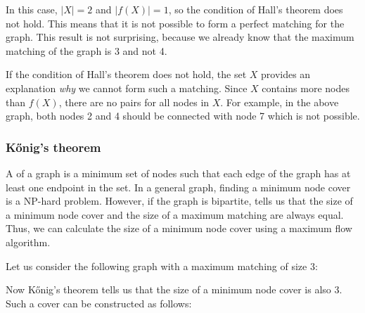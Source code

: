 In this case, $|X|=2$ and $|f(X)|=1$,
so the condition of Hall's theorem does not hold.
This means that it is not possible to form
a perfect matching for the graph.
This result is not surprising, because we already
know that the maximum matching of the graph is 3 and not 4.

If the condition of Hall's theorem does not hold,
the set $X$ provides an explanation \emph{why}
we cannot form such a matching.
Since $X$ contains more nodes than $f(X)$,
there are no pairs for all nodes in $X$.
For example, in the above graph, both nodes 2 and 4
should be connected with node 7 which is not possible.

\subsubsection{Kőnig's theorem}


A  of a graph
is a minimum set of nodes such that each edge of the graph
has at least one endpoint in the set.
In a general graph, finding a minimum node cover
is a NP-hard problem.
However, if the graph is bipartite,
 tells us that
the size of a minimum node cover
and the size of a maximum matching are always equal.
Thus, we can calculate the size of a minimum node cover
using a maximum flow algorithm.

Let us consider the following graph
with a maximum matching of size 3:
\begin{center}
\end{center}
Now Kőnig's theorem tells us that the size
of a minimum node cover is also 3.
Such a cover can be constructed as follows:

